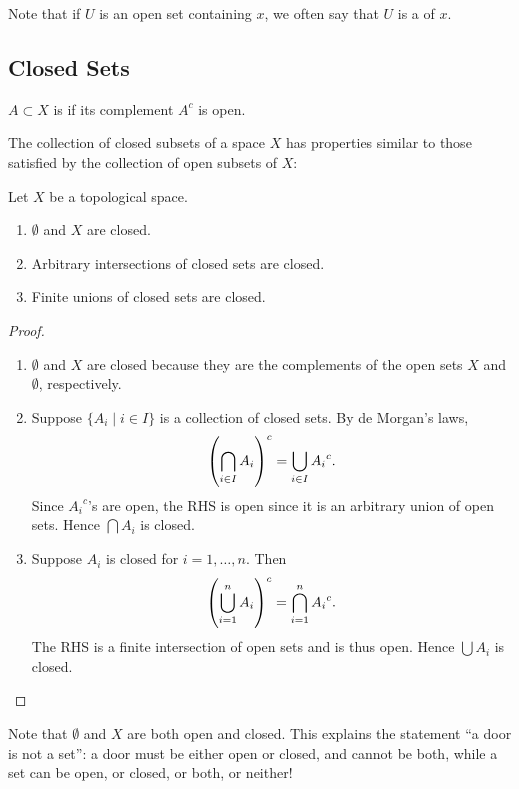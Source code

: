 Note that if $U$ is an open set containing $x$, we often say that $U$ is a  of $x$.

\subsection{Closed Sets}
\begin{definition}
$A\subset X$ is  if its complement $A^c$ is open.
\end{definition}

The collection of closed subsets of a space $X$ has properties similar to those satisfied by the collection of open subsets of $X$:
\begin{lemma}
Let $X$ be a topological space.
\begin{enumerate}[label=(\roman*)]
\item $\emptyset$ and $X$ are closed.
\item Arbitrary intersections of closed sets are closed.
\item Finite unions of closed sets are closed.
\end{enumerate}
\end{lemma}

\begin{proof} \
\begin{enumerate}[label=(\roman*)]
\item $\emptyset$ and $X$ are closed because they are the complements of the open sets $X$ and $\emptyset$, respectively.
\item Suppose $\{A_i\mid i\in I\}$ is a collection of closed sets. By de Morgan's laws,
\[\left(\bigcap_{i\in I}A_i\right)^c=\bigcup_{i\in I}{A_i}^c.\]
Since ${A_i}^c$'s are open, the RHS is open since it is an arbitrary union of open sets. Hence $\bigcap A_i$ is closed.
\item Suppose $A_i$ is closed for $i=1,\dots,n$. Then
\[\left(\bigcup_{i=1}^{n}A_i\right)^c=\bigcap_{i=1}^{n}{A_i}^c.\]
The RHS is a finite intersection of open sets and is thus open. Hence $\bigcup A_i$ is closed.
\end{enumerate}
\end{proof}

\begin{remark}
Note that $\emptyset$ and $X$ are both open and closed. This explains the statement ``a door is not a set'': a door must be either open or closed, and cannot be both, while a set can be open, or closed, or both, or neither!
\end{remark}

